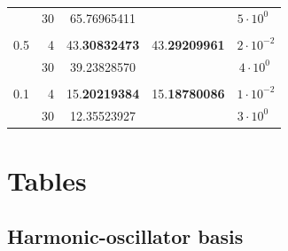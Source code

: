 \begin{table}
\begin{center}
{\begin{tabular}{rr|ccc}
	& 30 & 65.76965411 & & $5 \cdot 10^{0}$~ \\
& & \\
0.5 &  4 & 43.\textbf{30832473} & 43.\textbf{29209961} & $2 \cdot 10^{-2}$ \\
	& 30 & 39.23828570 & & $4 \cdot 10^{0}~$ \\
& & \\
0.1 &  4 & 15.\textbf{20219384} & 15.\textbf{18780086} & $1 \cdot 10^{-2}$ \\
	& 30 & 12.35523927 & & $3 \cdot 10^{0}$~ \\
\hline \hline
\end{tabular}
}
\end{center}
\end{table}

















\FloatBarrier
\section{Tables}
\label{sec:results:theResults}
\subsection{Harmonic-oscillator basis}
\FloatBarrier

